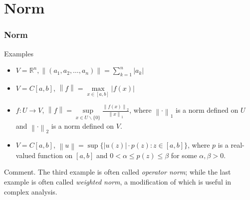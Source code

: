 \documentclass[12pt, t]{beamer}
\renewcommand{\emph}[1]{{\color{Turquoise3}\textsl{#1}}}
\begin{document}
\section{Norm}
\begin{frame}
    \frametitle{Norm}
    Examples\\

    \begin{itemize}
        \item $V=\mathbb{R}^n, \left\lVert (a_1,a_2,\dots,a_n)\right\rVert =\sum^{n}_{k=1}\left\vert a_k \right\vert $
        \item $V=C[a,b]$, $\left\lVert f\right\rVert =\underset{x\in[a,b]}{\max}\left\vert f(x) \right\vert $
        \item $f\colon U\rightarrow V$, $\left\lVert f\right\rVert =\underset{x\in U\backslash\{0\}}{\sup}\frac{\left\lVert f(x)\right\rVert_2}{\left\lVert x\right\rVert_1}$, where $\left\lVert \cdot\right\rVert _1$ is a norm defined on $U$ and $\left\lVert \cdot\right\rVert _2$ is a norm defined on $V$.
        \item $V=C[a,b]$, $\left\lVert u\right\rVert =\sup\{\left\vert u(z) \right\vert \cdot p(z)\colon z\in[a,b]\}$, where $p$ is a real-valued function on $[a,b]$ and $0<\alpha\leq p(z)\leq \beta $ for some $\alpha,\beta>0$.
    \end{itemize}

    \vspace{1em}
    Comment. The third example is often called \emph{operator norm}; while the last example is often called \emph{weighted norm}, a modification of which is useful in complex analysis.

\end{frame}
\end{document}
